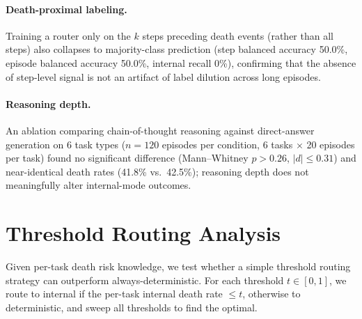 \documentclass[11pt]{article}
\begin{document}
\paragraph{Death-proximal labeling.} Training a router only on the $k$ steps preceding death events (rather than all steps) also collapses to majority-class prediction (step balanced accuracy 50.0\%, episode balanced accuracy 50.0\%, internal recall 0\%), confirming that the absence of step-level signal is not an artifact of label dilution across long episodes.

\paragraph{Reasoning depth.} An ablation comparing chain-of-thought reasoning against direct-answer generation on 6 task types ($n{=}120$ episodes per condition, 6 tasks $\times$ 20 episodes per task) found no significant difference (Mann--Whitney $p > 0.26$, $|d| \leq 0.31$) and near-identical death rates (41.8\% vs.\ 42.5\%); reasoning depth does not meaningfully alter internal-mode outcomes.

\section{Threshold Routing Analysis}
\label{sec:threshold-routing}

Given per-task death risk knowledge, we test whether a simple threshold routing strategy can outperform always-deterministic. For each threshold $t \in [0, 1]$, we route to internal if the per-task internal death rate $\leq t$, otherwise to deterministic, and sweep all thresholds to find the optimal.

\begin{table}[h]
\centering
\small
{}
\caption{Death-risk threshold routing analysis on 245 episodes. The optimal threshold routes only \texttt{find-non-living-thing} (the sole zero-death task) to internal, with all other tasks routed to deterministic. Bootstrap 95\% CI for the difference: $[-8.87, +5.92]$.}
\label{tab:threshold-routing}
\end{table}
\end{document}
